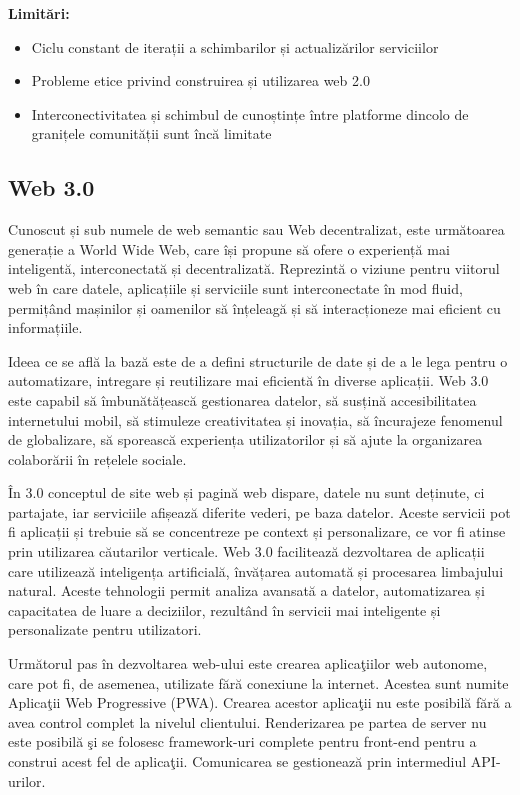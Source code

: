 \documentclass[12pt, a4paper]{report}
\begin{document}
\textbf{Limitări:}
\begin{itemize}
	\item Ciclu constant de iterații a schimbarilor și actualizărilor serviciilor
	\item Probleme etice privind construirea și utilizarea web 2.0
	\item Interconectivitatea și schimbul de cunoștințe între platforme dincolo de granițele comunității sunt încă limitate
\end{itemize}

\subsection{Web 3.0}

Cunoscut și sub numele de web semantic sau Web decentralizat, este următoarea generație a World Wide Web, care își propune să ofere o experiență mai inteligentă, interconectată și decentralizată. Reprezintă o viziune pentru viitorul web în care datele, aplicațiile și serviciile sunt interconectate în mod fluid, permițând mașinilor și oamenilor să înțeleagă și să interacționeze mai eficient cu informațiile.

Ideea ce se află la bază este de a defini structurile de date și de a le lega pentru o automatizare, intregare și reutilizare mai eficientă în diverse aplicații. Web 3.0 este capabil să îmbunătățească gestionarea datelor, să susțină accesibilitatea internetului mobil, să stimuleze creativitatea și inovația, să încurajeze fenomenul de globalizare, să sporească experiența utilizatorilor și să ajute la organizarea colaborării în rețelele sociale.

În 3.0 conceptul de site web și pagină web dispare, datele nu sunt deținute, ci partajate, iar serviciile afișează diferite vederi, pe baza datelor. Aceste servicii pot fi aplicații și trebuie să se concentreze pe context și personalizare, ce vor fi atinse prin utilizarea căutarilor verticale. Web 3.0 facilitează dezvoltarea de aplicații care utilizează inteligența artificială, învățarea automată și procesarea limbajului natural. Aceste tehnologii permit analiza avansată a datelor, automatizarea și capacitatea de luare a deciziilor, rezultând în servicii mai inteligente și personalizate pentru utilizatori.

Urm\u atorul pas \^ in dezvoltarea web-ului este crearea aplica\c tiilor web autonome, care pot fi, de asemenea, utilizate f\u ar\u a conexiune la internet. Acestea sunt numite Aplica\c tii Web Progressive (PWA). Crearea acestor aplica\c tii nu este posibil\u a f\u ar\u a a avea control complet la nivelul clientului. Renderizarea pe partea de server nu este posibil\u a \c si se folosesc framework-uri complete pentru front-end pentru a construi acest fel de aplica\c tii. Comunicarea se gestioneaz\u a prin intermediul API-urilor.\cite{pwa}
\end{document}
